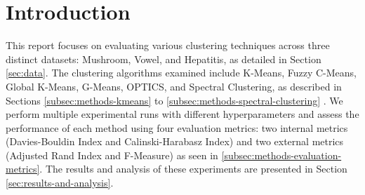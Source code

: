 \section{Introduction}
\label{sec:introduction}


This report focuses on evaluating various clustering techniques across three distinct datasets: Mushroom, Vowel, and Hepatitis, as detailed in Section \ref{sec:data}. The clustering algorithms examined include K-Means, Fuzzy C-Means, Global K-Means, G-Means, OPTICS, and Spectral Clustering, as described in Sections \ref{subsec:methods-kmeans} to \ref{subsec:methods-spectral-clustering} . We perform multiple experimental runs with different hyperparameters and assess the performance of each method using four evaluation metrics: two internal metrics (Davies-Bouldin Index and Calinski-Harabasz Index) and two external metrics (Adjusted Rand Index and F-Measure) as seen in \ref{subsec:methods-evaluation-metrics}. The results and analysis of these experiments are presented in Section \ref{sec:results-and-analysis}.
